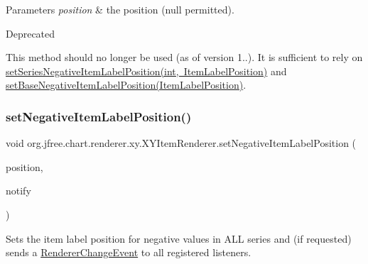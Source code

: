 \begin{DoxyParams}{Parameters}
{\em position} & the position ({\ttfamily null} permitted).\\
\hline
\end{DoxyParams}
\begin{DoxyRefDesc}{Deprecated}
\item[\mbox{\hyperlink{deprecated__deprecated000237}{Deprecated}}]This method should no longer be used (as of version 1..). It is sufficient to rely on \mbox{\hyperlink{interfaceorg_1_1jfree_1_1chart_1_1renderer_1_1xy_1_1_x_y_item_renderer_ad38b027443db1d0eec0a0367f341450a}{set\+Series\+Negative\+Item\+Label\+Position(int, Item\+Label\+Position)}} and \mbox{\hyperlink{interfaceorg_1_1jfree_1_1chart_1_1renderer_1_1xy_1_1_x_y_item_renderer_ac8e02ba738601c4f11c19e075e202578}{set\+Base\+Negative\+Item\+Label\+Position(\+Item\+Label\+Position)}}. \end{DoxyRefDesc}
\mbox{\label{interfaceorg_1_1jfree_1_1chart_1_1renderer_1_1xy_1_1_x_y_item_renderer_a0b86ebbd5d5e78880f670f464d2050e4}} 
\subsubsection{\texorpdfstring{set\+Negative\+Item\+Label\+Position()}{setNegativeItemLabelPosition()}\hspace{0.1cm}{\footnotesize\ttfamily [2/2]}}
{\footnotesize\ttfamily void org.\+jfree.\+chart.\+renderer.\+xy.\+X\+Y\+Item\+Renderer.\+set\+Negative\+Item\+Label\+Position (\begin{DoxyParamCaption}\item[{\mbox{\hyperlink{classorg_1_1jfree_1_1chart_1_1labels_1_1_item_label_position}{Item\+Label\+Position}}}]{position,  }\item[{boolean}]{notify }\end{DoxyParamCaption})}

Sets the item label position for negative values in A\+LL series and (if requested) sends a \mbox{\hyperlink{}{Renderer\+Change\+Event}} to all registered listeners.



